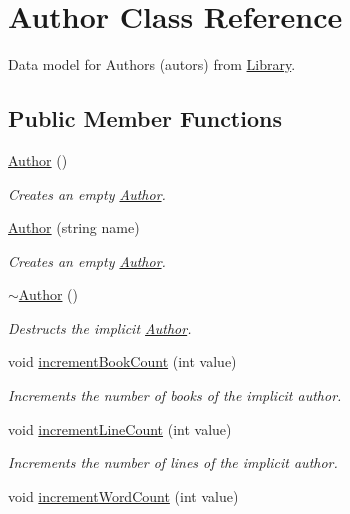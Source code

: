 \hypertarget{class_author}{\section{Author Class Reference}
\label{class_author}
}


Data model for Authors (autors) from \hyperlink{class_library}{Library}.  


\subsection*{Public Member Functions}
\begin{DoxyCompactItemize}
\item 
\hyperlink{class_author_a5f7059590a8e823fe0713faf66126b17}{Author} ()
\begin{DoxyCompactList}\small\item\em Creates an empty \hyperlink{class_author}{Author}. \end{DoxyCompactList}\item 
\hyperlink{class_author_a4a8afd3af0d6f7492bd04dcd44dc9f95}{Author} (string name)
\begin{DoxyCompactList}\small\item\em Creates an empty \hyperlink{class_author}{Author}. \end{DoxyCompactList}\item 
\hyperlink{class_author_ae1d4db056b321487cf7c07a2045d4a2d}{$\sim$\-Author} ()
\begin{DoxyCompactList}\small\item\em Destructs the implicit \hyperlink{class_author}{Author}. \end{DoxyCompactList}\item 
void \hyperlink{class_author_afa8dc68382f3e9828112ed440c3677d3}{increment\-Book\-Count} (int value)
\begin{DoxyCompactList}\small\item\em Increments the number of books of the implicit author. \end{DoxyCompactList}\item 
void \hyperlink{class_author_a73814ef0d8d840880415c4020a4d5bf9}{increment\-Line\-Count} (int value)
\begin{DoxyCompactList}\small\item\em Increments the number of lines of the implicit author. \end{DoxyCompactList}\item 
void \hyperlink{class_author_af12d32bb751a9ac3e1508631e4d8fb8e}{increment\-Word\-Count} (int value)

\end{DoxyCompactItemize}
